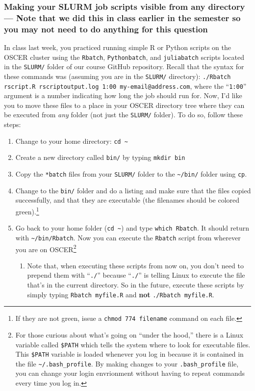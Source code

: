 \documentclass[12pt,english]{exam}
\begin{document}
\begin{questions}
\subsubsection*{Making your SLURM job scripts visible from any directory --- Note that we did this in class earlier in the semester so you may not need to do anything for this question}
\question In class last week, you practiced running simple R or Python scripts on the OSCER cluster using the \texttt{Rbatch}, \texttt{Pythonbatch}, and \texttt{juliabatch} scripts located in the \texttt{SLURM/} folder of our course GitHub repository. Recall that the syntax for these commands was (assuming you are in the \texttt{SLURM/} directory): \texttt{./Rbatch rscript.R rscriptoutput.log 1:00 my-email@address.com}, where the ``\texttt{1:00}'' argument is a number indicating how long the job should run for.
Now, I'd like you to move these files to a place in your OSCER directory tree where they can be executed from \emph{any} folder (not just the \texttt{SLURM/} folder). To do so, follow these steps:
\begin{enumerate}
    \item Change to your home directory: \texttt{cd \textasciitilde}
    \item Create a new directory called \texttt{bin/} by typing \texttt{mkdir bin}
    \item Copy the \texttt{*batch} files from your \texttt{SLURM/} folder to the \texttt{\textasciitilde/bin/} folder using \texttt{cp}.
    \item Change to the \texttt{bin/} folder and do a listing and make sure that the files copied successfully, and that they are executable (the filenames should be colored green).\footnote{If they are not green, issue a \texttt{chmod 774 filename} command on each file.}
    \item Go back to your home folder (\texttt{cd \textasciitilde}) and type \texttt{which Rbatch}. It should return with \texttt{\textasciitilde/bin/Rbatch}. Now you can execute the \texttt{Rbatch} script from wherever you are on OSCER\footnote{For those curious about what's going on ``under the hood,'' there is a Linux variable called \texttt{\$PATH} which tells the system where to look for executable files. This \texttt{\$PATH} variable is loaded whenever you log in because it is contained in the file \texttt{\textasciitilde/.bash\_profile}. By making changes to your \texttt{.bash\_profile} file, you can change your login envrionment without having to repeat commands every time you log in.}
    \begin{enumerate}
    \item Note that, when executing these scripts from now on, you don't need to prepend them with ``\texttt{./}'' because ``\texttt{./}'' is telling Linux to execute the file that's in the current directory. So in the future, execute these scripts by simply typing \texttt{Rbatch myfile.R} and \textbf{not} \texttt{./Rbatch myfile.R}.
    \end{enumerate}
\end{enumerate}

\end{questions}
\end{document}
